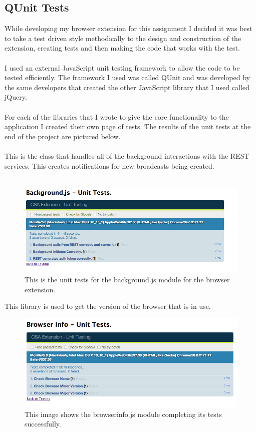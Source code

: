 \documentclass{article}
\begin{document}
\subsection{QUnit Tests}

While developing my browser extension for this assignment I decided it was best to take a test driven style methodically to the design and construction of the extension, creating tests and then making the code that works with the test.\\
\\
I used an external JavaScript unit testing framework to allow the code to be tested efficiently. The framework I used was called QUnit and was developed by the same developers that created the other JavaScript library that I used called jQuery.\\
\\
For each of the libraries that I wrote to give the core functionality to the application I created their own page of tests. The results of the unit tests at the end of the project are pictured below.\\
\\
This is the class that handles all of the background interactions with the REST services. This creates notifications for new broadcasts being created.\\
\\
\begin{figure}[H]
\centering
\includegraphics[width=\textwidth]{backgroundqunit}
\caption{This is the unit tests for the background.js module for the browser extension.}
\end{figure}

This library is used to get the version of the browser that is in use.\\

\begin{figure}[H]
\centering
\includegraphics[width=\textwidth]{biqunit}
\caption{This image shows the browserinfo.js module completing its tests successfully.}
\end{figure}
\end{document}
